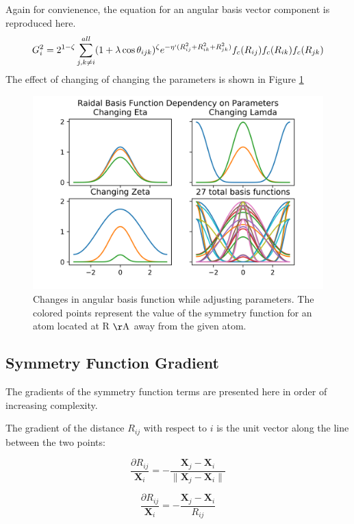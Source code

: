 \documentclass{article}
\newcommand{\mb}[1]{\mathbf{#1}}
\begin{document}
Again for convienence, the equation for an angular basis vector component is reproduced here.
\begin{equation}\label{eq:apang}
	G_i^2 = 2^{1 - \zeta} \sum_{j,k \neq i}^{all} ( 1 + \lambda \cos{\theta_{ijk}}) ^\zeta e^{-\eta` ( R_{ij}^2 + R_{ik}^2 + R_{jk}^2)} f_c (R_{ij}) f_c(R_{ik}) f_c(R_{jk})
\end{equation}
The effect of changing of changing the parameters is shown in Figure \ref{fig:ang_funcs}
\begin{figure}
	\includegraphics[width=\linewidth]{./img/ang_graphs.png}	\caption{Changes in angular basis function while adjusting parameters. The colored points represent the value of the symmetry function for an atom located at R $\mathrm{\AA}$ away from the given atom.}
	\label{fig:ang_funcs}
\end{figure}
\subsection{Symmetry Function Gradient}
The gradients of the symmetry function terms are presented here in order of increasing complexity.

The gradient of the distance $R_{ij}$ with respect to $i$ is the unit vector along the line between the two points:

\begin{equation}
\frac{\partial R_{ij}}{\mb{X}_{i}} = -\frac{\mathbf{X}_j-\mathbf{X}_i}{\lVert \mathbf{X}_j - \mathbf{X}_i \rVert}
\end{equation}

\begin{equation}
\frac{\partial R_{ij}}{\mb{X}_{i}} = -\frac{\mathbf{X}_j-\mathbf{X}_i}{R_{ij}}
\end{equation}
\end{document}
